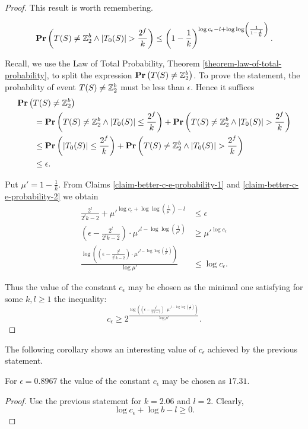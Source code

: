 \begin{proof}
This result is worth remembering.
\begin{claim}
\label{claim-better-c-e-probability-2}
\[
\mathbf{Pr}\left(T(S) \neq \mathbb{Z}_{2}^{b} \wedge |T_0(S)| > \frac {2 ^ f}{k}\right) \leq \left(1 - \frac{1}{k}\right) ^ {\log c_\epsilon - l + \log \log \left(\frac{1}{1 - \frac{1}{k}} \right)} \text{.}
\]
\end{claim}

Recall, we use the Law of Total Probability, Theorem \ref{theorem-law-of-total-probability}, to split the expression $\mathbf{Pr}\left(T(S) \neq \mathbb{Z}_{2}^{b}\right)$. To prove the statement, the probability of event $T(S) \neq \mathbb{Z}_{2}^{b}$ must be less than $\epsilon$. Hence it suffices
\[
\begin{split}
& \mathbf{Pr}\left(T(S) \neq \mathbb{Z}_{2}^{b}\right) \\
	& \qquad = \mathbf{Pr}\left(T(S) \neq \mathbb{Z}_{2}^{b} \wedge |T_0(S)| \leq \frac {2 ^ f}{k}\right) + \mathbf{Pr}\left(T(S) \neq \mathbb{Z}_{2}^{b} \wedge |T_0(S)| > \frac {2 ^ f}{k}\right) \\
	& \qquad \leq \mathbf{Pr}\left(|T_0(S)| \leq \frac {2 ^ f}{k}\right) + \mathbf{Pr}\left(T(S) \neq \mathbb{Z}_{2}^{b} \wedge |T_0(S)| > \frac {2 ^ f}{k}\right) \\
	& \qquad \leq \epsilon \text{.}
\end{split}
\]

Put $\mu' = 1 - \frac 1k$. From Claims \ref{claim-better-c-e-probability-1} and \ref{claim-better-c-e-probability-2} we obtain
\[
\begin{split}
\frac{2^l}{2^l k - 2} + {\mu'}^{\log c_\epsilon + \log \log \left( \frac{1}{\mu'} \right) - l} & \leq \epsilon \\
{\left(\epsilon - \frac{2^l}{2^l k - 2}\right)}\cdot{{\mu'} ^ {l - \log \log \left(\frac{1}{\mu'}\right)}} & \geq {\mu'}^{\log c_\epsilon} \\
\frac{\log \left({\left(\epsilon - \frac{2^l}{2^l k - 2}\right)}\cdot{{\mu'} ^ {l - \log \log \left( \frac{1}{\mu'} \right)}}\right)}{\log {\mu'}} & \leq \log c_\epsilon \text{.}
\end{split}
\]

Thus the value of the constant $c_\epsilon$ may be chosen as the minimal one satisfying for some $k, l \geq 1$ the inequality:
\[
c_\epsilon \geq 2 ^ {\frac{\log \left({\left(\epsilon - \frac{2^l}{2^l k - 2}\right)}\cdot{{\mu'} ^ {l - \log \log \left( \frac{1}{\mu'} \right)}}\right)}{\log {\mu'}}} \text{.}
\]
\end{proof}

The following corollary shows an interesting value of $c_\epsilon$ achieved by the previous statement.
\begin{corollary}
For $\epsilon = 0.8967$ the value of the constant $c_\epsilon$ may be chosen as $17.31$.
\end{corollary}
\begin{proof}
Use the previous statement for $k = 2.06$ and $l = 2$. Clearly, \[ \log c_{\epsilon} + \log b - l \geq 0 \text{.} \]
\end{proof}
